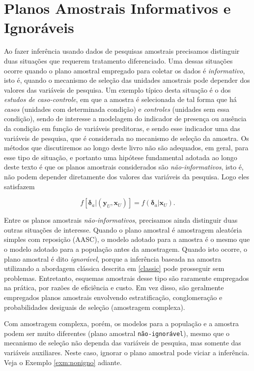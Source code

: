 \documentclass[]{book}
\theoremstyle{definition}
\theoremstyle{definition}
\theoremstyle{definition}
\theoremstyle{remark}
\begin{document}
\section{Planos Amostrais Informativos e Ignoráveis}\label{inform}

Ao fazer inferência usando dados de pesquisas amostrais precisamos
distinguir duas situações que requerem tratamento diferenciado. Uma
dessas situações ocorre quando o plano amostral empregado para coletar
os dados é \emph{informativo}, isto é, quando o mecanismo de seleção das
unidades amostrais pode depender dos valores das variáveis de pesquisa.
Um exemplo típico desta situação é o dos
\emph{estudos de caso-controle}, em que a amostra é selecionada de tal
forma que há \emph{casos} (unidades com determinada condição) e
\emph{controles} (unidades sem essa condição), sendo de interesse a
modelagem do indicador de presença ou ausência da condição em função de
variáveis preditoras, e sendo esse indicador uma das variáveis de
pesquisa, que é considerada no mecanismo de seleção da amostra. Os
métodos que discutiremos ao longo deste livro não são adequados, em
geral, para esse tipo de situação, e portanto uma hipótese fundamental
adotada ao longo deste texto é que os planos amostrais considerados são
\emph{não-informativos}, isto é, não podem depender diretamente dos
valores das variáveis da pesquisa. Logo eles satisfazem

\begin{equation}
f\left[ \mathbf{\delta }_a | \left( \mathbf{y}_U , \mathbf{x}_U \right)
\right] = f\left( \mathbf{\delta }_a | \mathbf{x}_U \right) . \label{eq:ref7}
\end{equation}

Entre os planos amostrais \emph{não-informativos}, precisamos ainda
distinguir duas outras situações de interesse. Quando o plano amostral é
amostragem aleatória simples com reposição (AASC), o modelo adotado para
a amostra é o mesmo que o modelo adotado para a população antes da
amostragem. Quando isto ocorre, o plano amostral é dito
\emph{ignorável}, porque a inferência baseada na amostra utilizando a
abordagem clássica descrita em \ref{classic} pode prosseguir sem
problemas. Entretanto, esquemas amostrais desse tipo são raramente
empregados na prática, por razões de eficiência e custo. Em vez disso,
são geralmente empregados planos amostrais envolvendo estratificação,
conglomeração e probabilidades desiguais de seleção (amostragem
complexa).

Com amostragem complexa, porém, os modelos para a população e a amostra
podem ser muito diferentes (plano amostral \texttt{não-ignorável}),
mesmo que o mecanismo de seleção não dependa das variáveis de pesquisa,
mas somente das variáveis auxiliares. Neste caso, ignorar o plano
amostral pode viciar a inferência. Veja o Exemplo \ref{exm:nonigno}
adiante.
\end{document}
